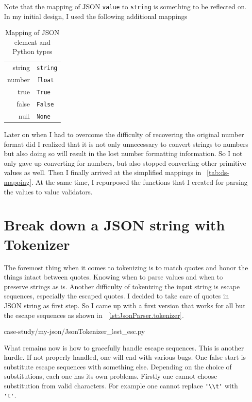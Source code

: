 \documentclass[oneside,11pt]{book}
\theoremstyle{definition}
\theoremstyle{remark}
\newcommand{\code}[1]{\mbox{\lstinline{#1}}}
\newcommand{\python}{Python }
\begin{document}
Note that the mapping of JSON \code{value} to \code{string} is something to be reflected on.
In my initial design, I used the following additional mappings

\begin{table}[h]
    \begin{center}
        \caption{Mapping of JSON element and \python types}
        \begin{tabular}{r|l}
            string & \code{string} \\
            number & \code{float} \\
            true & \code{True} \\
            false & \code{False} \\
            null & \code{None} \\
        \end{tabular}
    \end{center}
\end{table}

Later on when I had to overcome the difficulty of recovering the original number format did I
realized that it is not only unnecessary to convert strings to numbers but also doing so will
result in the lost number formatting information.
So I not only gave up converting for numbers, but also stopped converting other primitive values
as well.
Then I finally arrived at the simplified mappings in ~\autoref{tab:ds-mapping}.
At the same time, I repurposed the functions that I created for parsing the values to value
validators.

\section{Break down a JSON string with Tokenizer}\label{sec:JsonTokenizer}

The foremost thing when it comes to tokenizing
is to match quotes and honor the things intact between quotes.
Knowing when to parse values and when to preserve strings as is.
Another difficulty of tokenizing the input string is escape sequences, especially the escaped
quotes.
I decided to take care of quotes in JSON string as first step.
So I came up with a first version that works for all
but the escape sequences as shown in ~\autoref{lst:JsonParser.tokenizer}.


{case-study/my-json/JsonTokenizer_lest_esc.py}

What remains now is how to gracefully handle escape sequences.
This is another hurdle.
If not properly handled, one will end with various bugs.
One false start is substitute escape sequences with something else.
Depending on the choice of substitutions, each one has its own problems.
Firstly one cannot choose substitution from valid characters.
For example one cannot replace \code{'\\t'} with \code{'t'}.
\end{document}
